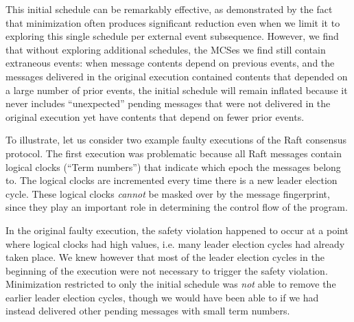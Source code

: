  This initial schedule
can be remarkably effective, as demonstrated by the fact that minimization
often produces significant reduction
even when we limit it to exploring this single schedule per external event subsequence. However, we find
that without exploring additional schedules, the MCSes we find still
contain extraneous events: when message contents depend on previous
events, and the messages delivered in the original execution contained
contents that depended on a large number of prior events, the initial schedule
will remain inflated because it never includes ``unexpected'' pending messages
that were not delivered in the original execution yet have contents that depend on fewer prior
events.

To illustrate, let us consider two example faulty executions of the Raft
consensus protocol. The first execution was problematic because all Raft messages contain logical clocks (``Term numbers'') that
indicate which epoch the messages belong to. The logical clocks are
incremented every time there is a new leader election cycle. These logical
clocks {\em cannot} be masked over by the message fingerprint, since they play
an important role in determining the control flow of the program.



In the original faulty execution, the
safety violation happened to occur at a point where
logical clocks had high values, i.e. many leader election cycles had already taken
place. We knew however that
most of the leader election cycles in the beginning of the execution were not
necessary to trigger the safety violation. Minimization restricted to only
the initial schedule was {\em not} able to remove the earlier
leader election cycles, though we would have been able to if we had instead delivered
other pending messages with small term numbers.

